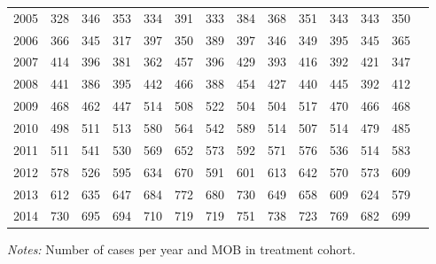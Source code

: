 \begin{table}[H]
\begin{threeparttable}
{\begin{tabular}{l*{13}{c}}
2005        &         328&         346&         353&         334&         391&         333&         384&         368&         351&         343&         343&         350\\
2006        &         366&         345&         317&         397&         350&         389&         397&         346&         349&         395&         345&         365\\
2007        &         414&         396&         381&         362&         457&         396&         429&         393&         416&         392&         421&         347\\
2008        &         441&         386&         395&         442&         466&         388&         454&         427&         440&         445&         392&         412\\
2009        &         468&         462&         447&         514&         508&         522&         504&         504&         517&         470&         466&         468\\
2010        &         498&         511&         513&         580&         564&         542&         589&         514&         507&         514&         479&         485\\
2011        &         511&         541&         530&         569&         652&         573&         592&         571&         576&         536&         514&         583\\
2012        &         578&         526&         595&         634&         670&         591&         601&         613&         642&         570&         573&         609\\
2013        &         612&         635&         647&         684&         772&         680&         730&         649&         658&         609&         624&         579\\
2014        &         730&         695&         694&         710&         719&         719&         751&         738&         723&         769&         682&         699\\
 \bottomrule \end{tabular} } \begin{tablenotes} \item \scriptsize \emph{Notes:} Number of cases per year and MOB in treatment cohort. \end{tablenotes} \end{threeparttable} \end{table} 
